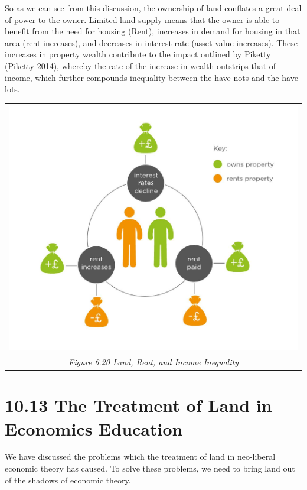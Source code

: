 \documentclass[]{tufte-handout}
\begin{document}
So as we can see from this discussion, the ownership of land conflates a
great deal of power to the owner. Limited land supply means that the
owner is able to benefit from the need for housing (Rent), increases in
demand for housing in that area (rent increases), and decreases in
interest rate (asset value increases). These increases in property
wealth contribute to the impact outlined by Piketty (Piketty
\protect\hyperlink{ref-Piketty2014a}{2014}), whereby the rate of the
increase in wealth outstrips that of income, which further compounds
inequality between the have-nots and the have-lots.

\begin{longtable}[]{@{}c@{}}
\toprule
\includegraphics{OtherPictures/WealthRentIncreases1.png}\tabularnewline
\midrule
\endhead
\emph{Figure 6.20 Land, Rent, and Income Inequality}\tabularnewline
\bottomrule
\end{longtable}

\hypertarget{the-treatment-of-land-in-economics-education}{%
\section{10.13 The Treatment of Land in Economics
Education}\label{the-treatment-of-land-in-economics-education}}

We have discussed the problems which the treatment of land in
neo-liberal economic theory has caused. To solve these problems, we need
to bring land out of the shadows of economic theory.
\end{document}
